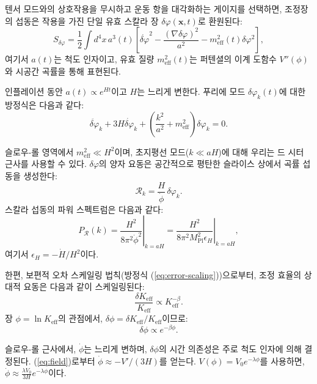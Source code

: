 \documentclass[11pt,a4paper]{article}
\newcommand{\Keff}{K_{\mathrm{eff}}}
\newcommand{\Mpl}{M_{\mathrm{Pl}}}
\begin{document}
	텐서 모드와의 상호작용을 무시하고 운동 항을 대각화하는 게이지를 선택하면, 조정장의 섭동은 작용을 가진 단일 유효 스칼라 장 \(\delta\varphi(\mathbf{x},t)\)로 환원된다:
	\begin{equation}
		S_{\delta\varphi} = \frac{1}{2} \int d^4x \, a^3(t) \left[ \dot{\delta\varphi}^2 - \frac{(\nabla\delta\varphi)^2}{a^2} - m_{\mathrm{eff}}^2(t) \delta\varphi^2 \right],
	\end{equation}
	여기서 \(a(t)\)는 척도 인자이고, 유효 질량 \(m_{\mathrm{eff}}^2(t)\)는 퍼텐셜의 이계 도함수 \(V''(\phi)\)와 시공간 곡률을 통해 표현된다.
	
	인플레이션 동안 \(a(t) \propto e^{Ht}\)이고 \(H\)는 느리게 변한다. 푸리에 모드 \(\delta\varphi_k(t)\)에 대한 방정식은 다음과 같다:
	\begin{equation}
		\ddot{\delta\varphi}_k + 3H\dot{\delta\varphi}_k + \left( \frac{k^2}{a^2} + m_{\mathrm{eff}}^2 \right) \delta\varphi_k = 0.
	\end{equation}
	
	슬로우-롤 영역에서 \(m_{\mathrm{eff}}^2 \ll H^2\)이며, 초지평선 모드(\(k \ll aH\))에 대해 우리는 드 시터 근사를 사용할 수 있다. \(\delta\varphi\)의 양자 요동은 공간적으로 평탄한 슬라이스 상에서 곡률 섭동을 생성한다:
	\begin{equation}
		\mathcal{R}_k = \frac{H}{\dot{\phi}} \, \delta\varphi_k.
	\end{equation}
	스칼라 섭동의 파워 스펙트럼은 다음과 같다:
	\begin{equation}
		P_{\mathcal{R}}(k) = \left. \frac{H^2}{8\pi^2 \dot{\phi}^2} \right|_{k=aH} = \left. \frac{H^2}{8\pi^2 \Mpl^2 \epsilon_H} \right|_{k=aH},
	\end{equation}
	여기서 \(\epsilon_H = -\dot{H}/H^2\)이다.
	
	한편, 보편적 오차 스케일링 법칙(방정식 (\ref{eq:error-scaling}))으로부터, 조정 효율의 상대적 요동은 다음과 같이 스케일링된다:
	\begin{equation}
		\frac{\delta\Keff}{\Keff} \propto \Keff^{-\beta}.
	\end{equation}
	장 \(\phi = \ln\Keff\)의 관점에서, \(\delta\phi = \delta\Keff/\Keff\)이므로:
	\begin{equation}
		\delta\phi \propto e^{-\beta\phi}.
	\end{equation}
	
	슬로우-롤 근사에서, \(\dot{\phi}\)는 느리게 변하며, \(\delta\phi\)의 시간 의존성은 주로 척도 인자에 의해 결정된다. (\ref{eq:field})로부터 \(\dot{\phi} \approx -V'/(3H)\)를 얻는다. \(V(\phi) = V_0 e^{-\lambda\phi}\)를 사용하면, \(\dot{\phi} \approx \frac{\lambda V_0}{3H} e^{-\lambda\phi}\)이다.
	
\end{document}
